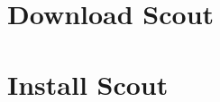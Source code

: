 \documentclass{article}
\begin{document}
\section*{Download Scout}

\section*{Install Scout}

\end{document}
